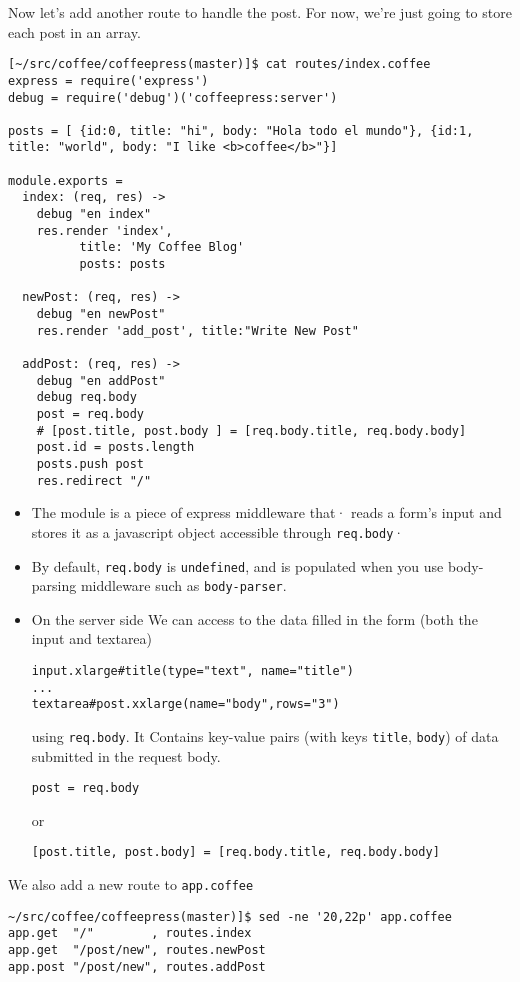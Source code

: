 Now let’s add another route to handle the post. 
For now, we’re just going to store each post in an array. 
\begin{verbatim}
[~/src/coffee/coffeepress(master)]$ cat routes/index.coffee 
express = require('express')
debug = require('debug')('coffeepress:server')

posts = [ {id:0, title: "hi", body: "Hola todo el mundo"}, {id:1, title: "world", body: "I like <b>coffee</b>"}] 

module.exports = 
  index: (req, res) ->
    debug "en index"
    res.render 'index', 
          title: 'My Coffee Blog' 
          posts: posts

  newPost: (req, res) ->
    debug "en newPost"
    res.render 'add_post', title:"Write New Post"

  addPost: (req, res) ->
    debug "en addPost"
    debug req.body
    post = req.body
    # [post.title, post.body ] = [req.body.title, req.body.body]
    post.id = posts.length
    posts.push post
    res.redirect "/"
\end{verbatim}
\begin{itemize}
\item
The module
 is a piece of express middleware that·
reads a form's input and stores it as a javascript
object accessible through \verb|req.body|·
\item
By default, \verb|req.body| is \verb|undefined|, 
and is populated when you use body-parsing middleware such as 
\verb|body-parser|.
\item
On the server side We can access to the data filled in the form 
(both the input and textarea)
\begin{verbatim}
input.xlarge#title(type="text", name="title")
...
textarea#post.xxlarge(name="body",rows="3")
\end{verbatim}
using \verb|req.body|. It
Contains key-value pairs (with keys \verb|title|, \verb|body|)
of data submitted in the request body. 
\begin{verbatim}
post = req.body
\end{verbatim}
or
\begin{verbatim}
[post.title, post.body] = [req.body.title, req.body.body]
\end{verbatim}
\end{itemize}

We also add a new route to \verb|app.coffee|
\begin{verbatim}
~/src/coffee/coffeepress(master)]$ sed -ne '20,22p' app.coffee 
app.get  "/"        , routes.index
app.get  "/post/new", routes.newPost
app.post "/post/new", routes.addPost
\end{verbatim}

